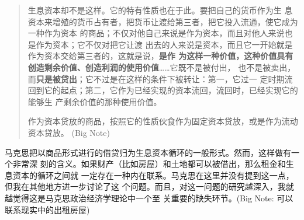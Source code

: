 \hrulefill \bigskip

\begin{quotation}生息资本却不是这样。它的特有性质也在于此。要把自己的货币作为生
息资本来增殖的货币占有者，把货币让渡给第三者，把它投入流通，使它成为一种作为资本
的商品；不仅对他自己来说是作为资本，而且对他人来说也是作为资本；它不仅对把它让渡
出去的人来说是资本，而且它一开始就是作为资本交给第三者的，这就是说，\textbf{是作
为这样一种价值，这种价值具有创造剩余价值、创造利润的使用价值}……它既不是被付出，
也不是被卖出，而\textbf{只是被贷出}；它不过是在这样的条件下被转让：第一，它过一
定时期流回到它的起点；第二，它作为已经实现的资本流回，流回时，已经实现它的能够生
产剩余价值的那种使用价值。

  作为资本贷放的商品，按照它的性质伙食作为固定资本贷放，或是作为流动资本贷放。
(Big Note)
\end{quotation}

马克思把以商品形式进行的借贷归为生息资本循环的一般形式。然而，这样做有一个非常深
刻的含义。如果财产（比如房屋）和土地都可以被借出，那么租金和生息资本的循环之间就
一定存在一种内在联系。马克思在这里并没有提到这一点，但我在其他地方进一步讨论了这
个问题。而且，对这一问题的研究越深入，我就越觉得这是马克思政治经济学理论中一个至
关重要的缺失环节。(Big Note: 可以联系现实中的出租房屋)

